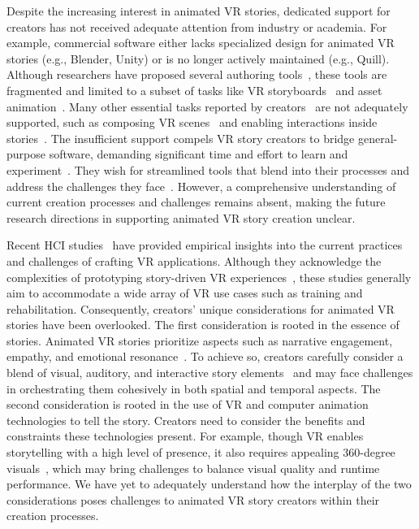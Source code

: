 Despite the increasing interest in animated VR stories, dedicated support for creators has not received adequate attention from industry or academia.
For example, commercial software either lacks specialized design for animated VR stories (e.g., Blender, Unity) or is no longer actively maintained (e.g., Quill).
Although researchers have proposed several authoring tools~\cite{galvane2019vr, stemasov2023sampling, wang2022videoposevr, nguyen2017collavr, vogel2018animationvr}, these tools are fragmented and limited to a subset of tasks like VR storyboards~\cite{henrikson2016multi, henrikson2016storeoboard, galvane2019vr} and asset animation~\cite{lamberti2020immersive, vogel2018animationvr, wang2022videoposevr}. Many other essential tasks reported by creators~\cite{ward2021tinker,gipson2018disneycicles,cutler2019making, darnell2016invasion} are not adequately supported, such as composing VR scenes~\cite{cutler2019making,gipson2018disneycicles} and enabling interactions inside stories~\cite{ward2021tinker,darnell2016invasion}.
The insufficient support compels VR story creators to bridge general-purpose software, demanding significant time and effort to learn and experiment~\cite{gipson2018disneycicles}. 
They wish for streamlined tools that blend into their processes and address the challenges they face~\cite{cutler2019making}.
However, a comprehensive understanding of current creation processes and challenges remains absent, making the future research directions in supporting animated VR story creation unclear.

Recent HCI studies~\cite{ashtari2020creating, krauss2021current,  krauss2022elements} have provided empirical insights into the current practices and challenges of crafting VR applications. Although they acknowledge the complexities of prototyping story-driven VR experiences~\cite{ashtari2020creating, krauss2021current}, these studies generally aim to accommodate a wide array of VR use cases such as training and rehabilitation. 
Consequently, creators' unique considerations for animated VR stories have been overlooked.
The first consideration is rooted in the essence of stories.
Animated VR stories prioritize aspects such as narrative engagement, empathy, and emotional resonance~\cite{bindman2018bunny, bahng2020reflexive}. To achieve so, creators carefully consider a blend of visual, auditory, and interactive story elements~\cite{cutler2019making,ward2021tinker} and may face challenges in orchestrating them cohesively in both spatial and temporal aspects.
The second consideration is rooted in the use of VR and computer animation technologies to tell the story. 
Creators need to consider the benefits and constraints these technologies present. For example, though VR enables storytelling with a high level of presence, it also requires appealing 360-degree visuals~\cite{cutler2019making,gipson2018disneycicles}, which may bring challenges to balance visual quality and runtime performance.
We have yet to adequately understand how the interplay of the two considerations poses challenges to animated VR story creators within their creation processes.

